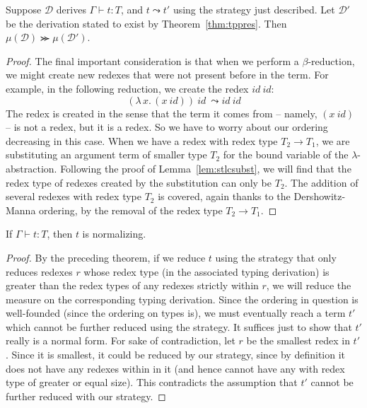 \documentclass{article}
\begin{document}
\vspace{.25cm}
\begin{theorem}
\label{thm:meas}
  Suppose $\mathcal{D}$ derives $\Gamma \vdash t : T$, and $t \leadsto t'$ using
  the strategy just described.
  Let $\mathcal{D}'$ be the derivation stated to exist by Theorem~\ref{thm:tppres}.
  Then $\mu(\mathcal{D}) \ggcurly \mu(\mathcal{D}')$.
\end{theorem}

\begin{proof}
  \noindent The final important consideration is that when we perform a $\beta$-reduction,
  we might create new redexes that were not present before in the term.  For example,
  in the following reduction, we create the redex $\textit{id}\ \textit{id}$:
  \[
  (\lambda\, x.\,(x\ \textit{id}))\ \textit{id} \ \leadsto
  \textit{id} \ \textit{id}
  \]
  \noindent The redex is created in the sense that the term it comes from -- namely, $(x\ \textit{id})$ -- is
  not a redex, but it is a redex.  So we have to worry about our ordering decreasing in this case.
  When we have a redex with redex type $T_2\to T_1$, we are substituting
  an argument term of smaller type $T_2$ for the bound variable of the $\lambda$-abstraction.
  Following the proof of Lemma~\ref{lem:stlcsubst}, we will find that the redex type of
  redexes created by the substitution can only be $T_2$.  The addition of several redexes
  with redex type $T_2$ is covered, again thanks to the Dershowitz-Manna ordering, by the
  removal of the redex type $T_2 \to T_1$.
\end{proof}

\begin{corollary}
  If $\Gamma \vdash t : T$, then $t$ is normalizing.
\end{corollary}
\begin{proof} By the preceding theorem, if we reduce $t$ using the strategy
  that only reduces redexes $r$ whose redex type (in the associated typing derivation) is greater than the
  redex types of any redexes strictly within $r$, we will reduce the
  measure on the corresponding typing derivation.  Since the ordering
  in question is well-founded (since the ordering on types is), we
  must eventually reach a term $t'$ which cannot be further reduced
  using the strategy.  It suffices just to show that $t'$ really is a
  normal form.  For sake of contradiction, let $r$ be the smallest
  redex in $t'$.  Since it is smallest, it could be reduced by our
  strategy, since by definition it does not have any redexes within in
  it (and hence cannot have any with redex type of greater or equal
  size).  This contradicts the assumption that $t'$ cannot be further
  reduced with our strategy.
\end{proof}
\end{document}
